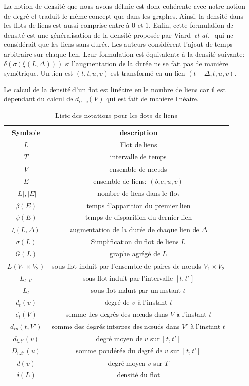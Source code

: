 La notion de densité que nous avons définie est donc cohérente avec notre notion de degré et traduit le même concept que dans les graphes.
Ainsi, la densité dans les flots de liens est aussi comprise entre à $0$ et $1$.
Enfin, cette formulation de densité est une généralisation de la densité proposée par Viard~\emph{et al.}~\cite{Viard2014a} qui ne considérait que les liens sans durée.
Les auteurs considèrent l'ajout de temps arbitraire sur chaque lien.
Leur formulation est équivalente à la densité suivante: $\delta( \sigma(\xi(L,\Delta)))$ si l'augmentation de la durée ne se fait pas de manière symétrique.
Un lien est $(t,t,u,v)$ est transformé en un lien $(t-\Delta,t,u,v)$.

Le calcul de la densité d'un flot est linéaire en le nombre de liens car il est dépendant du calcul de $d_{\alpha..\omega}(V)$  qui est fait de manière linéaire.


\begin{table}
	\centering
	\begin{tabular}{|c|c|}
	\hline Symbole & description \\
	\hline $L$ & Flot de liens \\ 
	$T$ & intervalle de temps  \\
	$V$ & ensemble de n\oe{}uds\\
	$E$ & ensemble de liens: $(b,e,u,v)$ \\
	$|L|,|E|$ & nombre de liens dans le flot \\
	$\beta(E)$ & temps d'apparition du premier lien\\
	$\psi(E)$ & temps de disparition du dernier lien\\
	$\xi(L,\Delta)$ & augmentation de la durée de chaque lien de $\Delta$\\
	$\sigma(L)$ & Simplification du flot de liens $L$\\
	$G(L)$ & graphe agrégé de $L$\\
	$L(V_1\times V_2)$ & sous-flot induit par l'ensemble de paires de n\oe{}uds $V_1\times V_2$ \\
	$L_{t..t'}$ & sous-flot induit par l'intervalle $[t,t']$ \\
	$L_{t}$ & sous-flot induit par un instant $t$\\
	$d_t(v)$ & degré de $v$ à l'instant $t$\\
	$d_t(V)$ & somme des degrés des n\oe{}uds dans $V$ à l'instant $t$\\
	$d_{in}(t,V')$ & somme des degrés internes des n\oe{}uds dans $V'$ à l'instant $t$\\
	$d_{t..t'}(v)$ & degré moyen de $v$ sur $[t,t']$\\
	$D_{t..t'}(u)$ & somme pondérée du degré de $v$ sur $[t,t']$\\
	$d(v)$ & degré moyen $v$ sur $T$\\
	$\delta(L)$ & densité du flot\\
	\hline
	\end{tabular} 
		\caption{Liste des notations pour les flots de liens}
\end{table}

